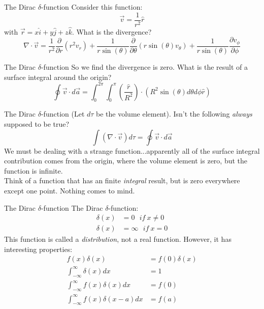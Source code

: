 \documentclass{beamer}
\begin{document}
\begin{frame}{The Dirac $\delta$-function}
Consider this function:
\begin{equation}
\vec{v} = \frac{1}{r^2}\hat{r}
\end{equation}
with $\vec{r} = x\hat{i} + y\hat{j} + z\hat{k}$.  What is the divergence?
\begin{equation}
\nabla \cdot \vec{v} = \frac{1}{r^2}\frac{\partial}{\partial r}(r^2 v_r) + \frac{1}{r\sin(\theta)}\frac{\partial}{\partial \theta}(r\sin(\theta) v_\theta) + \frac{1}{r\sin(\theta)} \frac{\partial v_\phi}{\partial \phi}
\end{equation}
\end{frame}

\begin{frame}{The Dirac $\delta$-function}
So we find the divergence is zero.  What is the result of a surface integral around the origin?
\begin{equation}
\oint \vec{v} \cdot d \vec{a} = \int_0^{2\pi} \int_0^{\pi} \left(\frac{\hat{r}}{R^2}\right) \cdot (R^2 \sin(\theta) d\theta d\phi \hat{r})
\end{equation}
\end{frame}

\begin{frame}{The Dirac $\delta$-function}
(Let $d\tau$ be the volume element).  Isn't the following \textit{always} supposed to be true?
\begin{equation}
\int (\nabla \cdot \vec{v}) d\tau = \oint \vec{v} \cdot d \vec{a}
\end{equation}
We must be dealing with a strange function...apparently all of the surface integral contribution comes from the origin, where the volume element is zero, but the function is infinite. \\ \vspace{0.2cm}
Think of a function that has an finite \textit{integral} result, but is zero everywhere except one point.  Nothing comes to mind.
\end{frame}

\begin{frame}{The Dirac $\delta$-function}
The Dirac $\delta$-function:
\begin{align}
\delta(x) &= 0 ~~~ if~x\neq 0 \\
\delta(x) &= \infty ~~~ if~x = 0
\end{align}
This function is called a \textit{distribution}, not a real function.  However, it has interesting properties:
\begin{align}
f(x) \delta(x) &= f(0) \delta(x) \\
\int_{-\infty}^{\infty} \delta(x) dx &= 1 \\
\int_{-\infty}^{\infty} f(x) \delta(x) dx &= f(0) \\
\int_{-\infty}^{\infty} f(x) \delta(x-a) dx &= f(a)
\end{align}
\end{frame}
\end{document}
